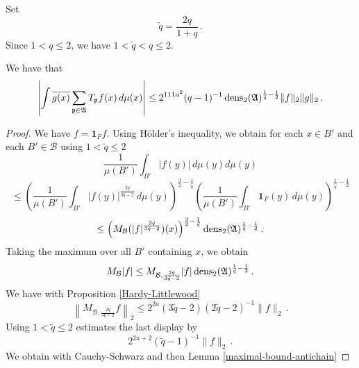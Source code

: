 {Set
\begin{equation}
    \tilde{q}=\frac {2q}{1+q}\,.
\end{equation}
Since $1< q\le 2$, we have $1<\tilde{q}<q\le 2$.
\begin{lemma}
\label{dens2-antichain}
We have that
\begin{equation}\label{eqttt9}
  \left|\int \overline{g(x)} \sum_{{\mathfrak p} \in \mathfrak{A}} T_{{\mathfrak p}} f(x)\, d\mu(x)\right|\le
  2^{111a^2}({q}-1)^{-1} \operatorname{\operatorname{dens}}_2(\mathfrak{A})^{\frac 1{\tilde{q}}-\frac 12} \|f\|_2\|g\|_2\, .
\end{equation}
\end{lemma}
\begin{proof}
We have $f=\mathbf{1}_Ff$. Using H\"older's inequality, we obtain for
each $x\in B'$ and each $B'\in \mathcal{B}$ using $1<\tilde{q}\le 2$
\begin{equation}
    \frac 1{\mu(B')}\int_{B'} |f(y)|\, d\mu(y)d\mu(y)
\end{equation}
\begin{equation}
    \le
    \left(\frac 1{\mu(B')}\int_{B'} |f(y)|^{\frac {2{\tilde{q}}}{3\tilde{q}-2}}\, d\mu(y)\right)^{\frac 32-\frac 1{\tilde{q}}}
    \left(\frac 1{\mu(B')}\int_{B'} \mathbf{1}_F(y)\, d\mu(y)\right)^{\frac 1{\tilde{q}}-\frac 12}
\end{equation}
\begin{equation}
    \le \left(M_{\mathcal{B}} (|f|^{\frac {2{\tilde{q}}}{3{\tilde{q}}-2}})(x)\right)^{\frac 32-\frac 1{\tilde{q}}}
\operatorname{\operatorname{dens}}_2(\mathfrak{A})^{\frac 1{\tilde{q}}-\frac 12}\, .
\end{equation}
Taking the maximum over all $B'$ containing $x$, we obtain
\begin{equation} \label{eqttt1}
    M_{\mathcal{B}}|f|\le
    M_{\mathcal{B},\frac {2{\tilde{q}}}{3{\tilde{q}}-2} } |f|
    \operatorname{\operatorname{dens}}_2(\mathfrak{A})^{\frac 1{\tilde{q}}-\frac 12}\, .
\end{equation}
We have with Proposition \ref{Hardy-Littlewood}
\begin{equation}
\left\|M_{\mathcal{B}, \frac {2q}{3q-2}} f\right\|_2\le 2^{2a}(3\tilde{q}-2)(2\tilde{q}-2)^{-1}\|f\|_2\, .
\end{equation}
Using $1<\tilde{q}\le 2$ estimates the last display by
\begin{equation}\label{eqttt2}
 2^{2a+2} (\tilde{q}-1)^{-1}  \|f\|_2\, .
\end{equation}
We obtain with Cauchy-Schwarz
and then Lemma \ref{maximal-bound-antichain}

\end{proof}}
